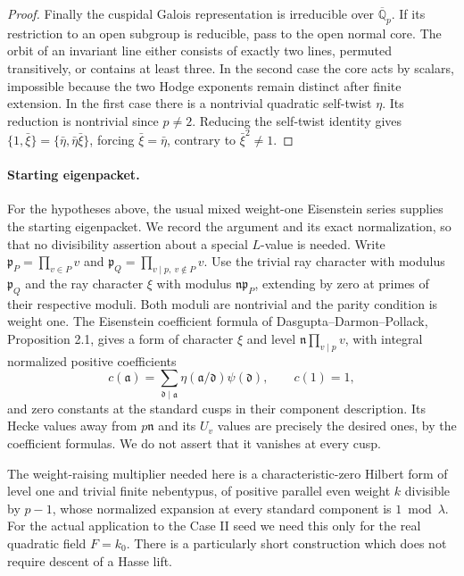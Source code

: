 \begin{proof}
Finally the cuspidal Galois representation is irreducible over
\(\overline{\mathbb Q}_p\). If its restriction to an open subgroup
is reducible, pass to the open normal core. The orbit of an
invariant line either consists of exactly two lines, permuted
transitively, or contains at least three. In the second case the
core acts by scalars, impossible because the two Hodge exponents
remain distinct after finite extension. In the first case there
is a nontrivial quadratic self-twist \(\eta\). Its reduction is
nontrivial since \(p\ne2\). Reducing the self-twist identity gives
\(\{1,\bar\xi\}=\{\bar\eta,\bar\eta\bar\xi\}\), forcing
\(\bar\xi=\bar\eta\), contrary to \(\bar\xi^2\ne1\).
\end{proof}

\paragraph{Starting eigenpacket.}
For the hypotheses above, the usual mixed weight-one Eisenstein
series supplies the starting eigenpacket. We record the argument
and its exact normalization, so that no divisibility assertion
about a special \(L\)-value is needed. Write
\(\mathfrak p_P=\prod_{v\in P}v\) and
\(\mathfrak p_Q=\prod_{v\mid p,\ v\notin P}v\).
Use the trivial ray character with modulus \(\mathfrak p_Q\)
and the ray character \(\xi\) with modulus
\(\mathfrak n\mathfrak p_P\), extending by zero at primes of
their respective moduli. Both moduli are nontrivial and the
parity condition is weight one. The Eisenstein coefficient
formula of Dasgupta--Darmon--Pollack, Proposition 2.1, gives
a form of character \(\xi\) and level
\(\mathfrak n\prod_{v\mid p}v\), with integral normalized
positive coefficients
\[
 c(\mathfrak a)=\sum_{\mathfrak d\mid\mathfrak a}
       \eta(\mathfrak a/\mathfrak d)\psi(\mathfrak d),
 \qquad c(1)=1 ,
\]
and zero constants at the standard cusps in their component
description. Its Hecke values away from \(p\mathfrak n\) and
its \(U_v\) values are precisely the desired ones, by the
coefficient formulas. We do not assert that it vanishes at
every cusp.

The weight-raising multiplier needed here is a characteristic-zero
Hilbert form of level one and trivial finite nebentypus, of positive
parallel even weight \(k\) divisible by \(p-1\), whose normalized
expansion at every standard component is \(1\bmod\lambda\).
For the actual application to the Case II seed we need this only for
the real quadratic field \(F=k_0\). There is a particularly short
construction which does not require descent of a Hasse lift.

